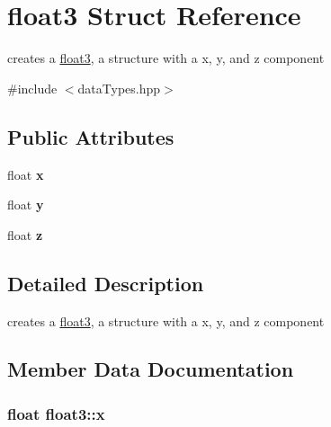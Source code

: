 \hypertarget{structfloat3}{}\section{float3 Struct Reference}
\label{structfloat3}


creates a \hyperlink{structfloat3}{float3}, a structure with a x, y, and z component  




{\ttfamily \#include $<$data\+Types.\+hpp$>$}

\subsection*{Public Attributes}
\begin{DoxyCompactItemize}
\item 
\hypertarget{structfloat3_af621f02abb1c788738fe61ea9807ff9c}{}float {\bfseries x}\label{structfloat3_af621f02abb1c788738fe61ea9807ff9c}

\item 
\hypertarget{structfloat3_aa6147d421a81889971f8c66aa92abf0d}{}float {\bfseries y}\label{structfloat3_aa6147d421a81889971f8c66aa92abf0d}

\item 
\hypertarget{structfloat3_a772dffd42d89f350c5a1b766c4703245}{}float {\bfseries z}\label{structfloat3_a772dffd42d89f350c5a1b766c4703245}

\end{DoxyCompactItemize}


\subsection{Detailed Description}
creates a \hyperlink{structfloat3}{float3}, a structure with a x, y, and z component 

\subsection{Member Data Documentation}
\hypertarget{structfloat3_af621f02abb1c788738fe61ea9807ff9c}{}
\subsubsection[{x}]{\setlength{\rightskip}{0pt plus 5cm}float float3\+::x}\label{structfloat3_af621f02abb1c788738fe61ea9807ff9c}
\hypertarget{structfloat3_aa6147d421a81889971f8c66aa92abf0d}{}
